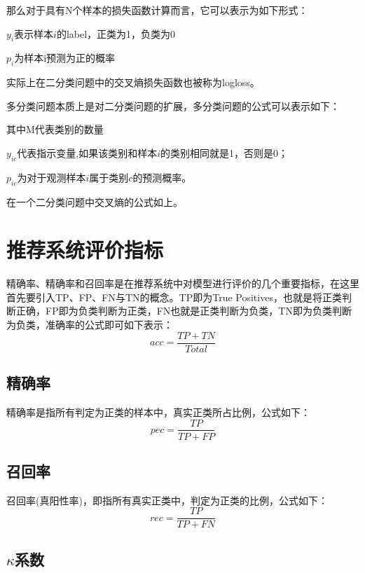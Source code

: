 那么对于具有N个样本的损失函数计算而言，它可以表示为如下形式：



$y_{i}$表示样本$i$的label，正类为1，负类为0

$p_{i}$为样本i预测为正的概率

实际上在二分类问题中的交叉熵损失函数也被称为logloss。

多分类问题本质上是对二分类问题的扩展，多分类问题的公式可以表示如下：




其中M代表类别的数量

$y_{ic}$代表指示变量,如果该类别和样本$i$的类别相同就是1，否则是0；

$p_{ic}$为对于观测样本$i$属于类别$c$的预测概率。

在一个二分类问题中交叉熵的公式如上。




\section{推荐系统评价指标}

精确率、精确率和召回率是在推荐系统中对模型进行评价的几个重要指标，在这里首先要引入TP、FP、FN与TN的概念。TP即为True Positives，也就是将正类判断正确，FP即为负类判断为正类，FN也就是正类判断为负类，TN即为负类判断为负类，准确率的公式即可如下表示：
\begin{equation}
  acc = \frac{TP + TN}{Total}
\end{equation}

\subsection{精确率}

精确率是指所有判定为正类的样本中，真实正类所占比例，公式如下：
\begin{equation}
  pec = \frac{TP}{TP + FP}
\end{equation}

\subsection{召回率}

召回率(真阳性率)，即指所有真实正类中，判定为正类的比例，公式如下：
\begin{equation}
  rec = \frac{TP}{TP + FN}
\end{equation}

\subsection{${\kappa}$系数}

